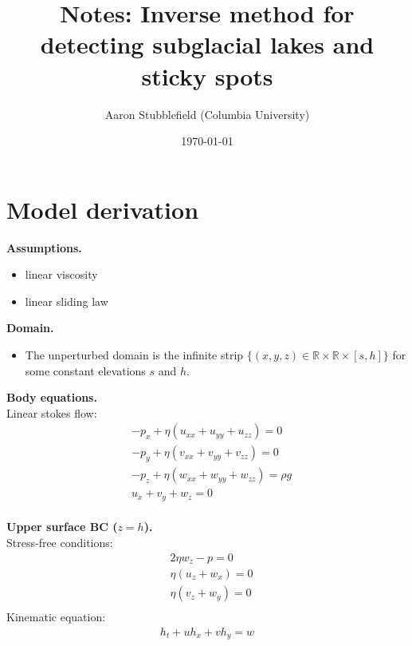 \documentclass[paper=a4, fontsize=11pt]{article}
\title{
\textbf{Notes:} Inverse method for detecting subglacial lakes and sticky spots
}
\author{ Aaron Stubblefield (Columbia University)} %
\date{\small\today} %
\begin{document}
\maketitle %
\section*{Model derivation}
\noindent\textbf{Assumptions.}
\begin{itemize}
\item linear viscosity\\
\item linear sliding law
\end{itemize}
\vspace{0.2cm}
\noindent\textbf{Domain.}
\begin{itemize}
\item The unperturbed domain is the infinite strip $\{(x,y,z)\in\mathbb{R}\times\mathbb{R}\times[s,h]\}$ for some constant
elevations $s$ and $h$.
\end{itemize}
\noindent\textbf{Body equations.}\\
Linear stokes flow:
\begin{align}
&-p_x + \eta ( u_{xx} +u_{yy} + u_{zz}) = 0  \\
&-p_y + \eta ( v_{xx}+v_{yy} + v_{zz}) = 0 \\
&-p_z + \eta ( w_{xx} +w_{yy} + w_{zz}) = \rho g \\
&u_x + v_y + w_z = 0
\end{align}
\\
\noindent\textbf{Upper surface BC ($z=h$).}\\
Stress-free conditions:
\begin{align}
&2\eta w_z - p = 0 \\
&\eta(u_z +w_x) = 0 \\
&\eta(v_z +w_y) = 0 \\
\end{align}
Kinematic equation:
\begin{align}
h_t + uh_x + vh_y = w
\end{align}
\end{document}
